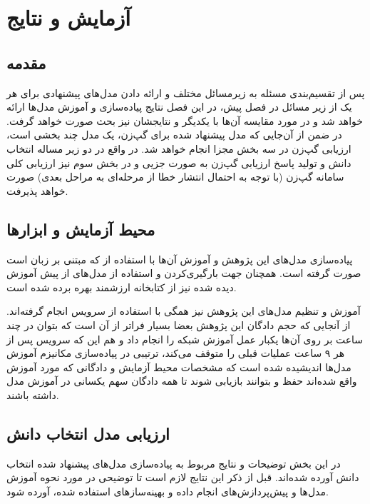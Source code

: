 \chapter{آزمایش و نتایج}\label{Chap5}
\minitoc

\section{مقدمه}

پس از تقسیم‌بندی مسئله به زیرمسائل مختلف و ارائه دادن مدل‌های پیشنهادی برای هر یک از زیر مسائل در فصل پیش، در این فصل نتایج پیاده‌سازی و آموزش مدل‌ها ارائه خواهد شد و در مورد مقایسه آن‌ها با یکدیگر و نتایجشان نیز بحث صورت خواهد گرفت. در ضمن از آن‌جایی که مدل پیشنهاد شده برای گپ‌زن، یک مدل چند بخشی است، ارزیابی گپ‌زن در سه بخش مجزا انجام خواهد شد. در واقع در دو زیر مساله انتخاب دانش و تولید پاسخ ارزیابی گپ‌زن به صورت جزیی و در بخش سوم نیز ارزیابی کلی سامانه گپ‌زن (با توجه به احتمال انتشار خطا از مرحله‌ای به مراحل بعدی) صورت خواهد پذیرفت.

\section{محیط آزمایش و ابزارها}

پیاده‌سازی مدل‌های این پژوهش و آموزش‌‌ ‌آن‌ها با استفاده از 
که مبتنی بر زبان
است صورت گرفته است. همچنان جهت بارگیری‌کردن و استفاده از مدل‌های از پیش آموزش دیده شده نیز از کتابخانه ارزشمند 
بهره برده شده است. 

آموزش و تنظیم‌ مدل‌های این پژوهش نیز همگی با استفاده از سرویس 
انجام گرفته‌اند. از آنجایی که حجم دادگان این پژوهش بعضا بسیار فراتر از آن است که بتوان در چند ساعت بر روی آن‌ها یکبار عمل آموزش شبکه را انجام داد و هم این که سرویس 
پس از هر ۹ ساعت عملیات قبلی را متوقف می‌کند،‌ ترتیبی در پیاده‌سازی مکانیزم آموزش مدل‌ها اندیشیده شده است که مشخصات محیط آزمایش و دادگانی که مورد آموزش واقع ‌شده‌اند حفظ و بتوانند بازیابی شوند تا همه دادگان سهم یکسانی در آموزش مدل داشته باشند. 



\section{ارزیابی مدل انتخاب دانش}

در این بخش توضیحات و نتایج مربوط به پیاده‌سازی مدل‌های پیشنهاد شده انتخاب دانش آورده شده‌اند. قبل از ذکر این نتایج لازم است تا توضیحی در مورد نحوه آموزش مدل‌ها و پیش‌پردازش‌های انجام داده و بهینه‌سازهای استفاده شده، آورده شود.


